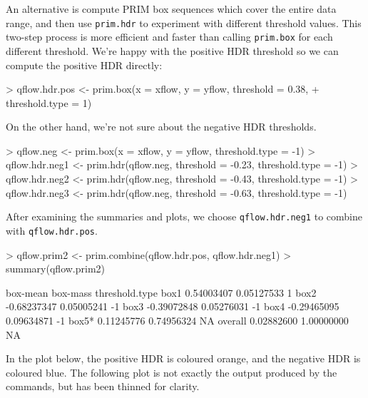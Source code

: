 \documentclass[a4paper,11pt]{article}
\begin{document}
An alternative is compute PRIM box sequences which cover the entire data range, 
and then use \texttt{prim.hdr} to experiment with different threshold values.
This two-step process is more efficient and faster than calling \texttt{prim.box}
for each different threshold.
We're happy with the positive HDR threshold so we can compute the positive
HDR directly: 
\begin{Schunk}
\begin{Sinput}
> qflow.hdr.pos <- prim.box(x = xflow, y = yflow, threshold = 0.38, 
+     threshold.type = 1)
\end{Sinput}
\end{Schunk}
On the other hand, we're not sure about the negative HDR thresholds.
\begin{Schunk}
\begin{Sinput}
> qflow.neg <- prim.box(x = xflow, y = yflow, threshold.type = -1)
> qflow.hdr.neg1 <- prim.hdr(qflow.neg, threshold = -0.23, threshold.type = -1)
> qflow.hdr.neg2 <- prim.hdr(qflow.neg, threshold = -0.43, threshold.type = -1)
> qflow.hdr.neg3 <- prim.hdr(qflow.neg, threshold = -0.63, threshold.type = -1)
\end{Sinput}
\end{Schunk}
After examining the summaries and plots, we  
choose \texttt{qflow.hdr.neg1} to combine with \texttt{qflow.hdr.pos}.
\begin{Schunk}
\begin{Sinput}
> qflow.prim2 <- prim.combine(qflow.hdr.pos, qflow.hdr.neg1)
> summary(qflow.prim2)
\end{Sinput}
\begin{Soutput}
           box-mean   box-mass threshold.type
box1     0.54003407 0.05127533              1
box2    -0.68237347 0.05005241             -1
box3    -0.39072848 0.05276031             -1
box4    -0.29465095 0.09634871             -1
box5*    0.11245776 0.74956324             NA
overall  0.02882600 1.00000000             NA
\end{Soutput}
\end{Schunk}
In the plot below, the positive HDR is coloured orange, and the 
negative HDR is coloured blue.  
The following plot is not exactly the output produced by the commands,
but has been thinned for clarity.
\begin{Schunk}
\end{Schunk}
 
\end{document}
